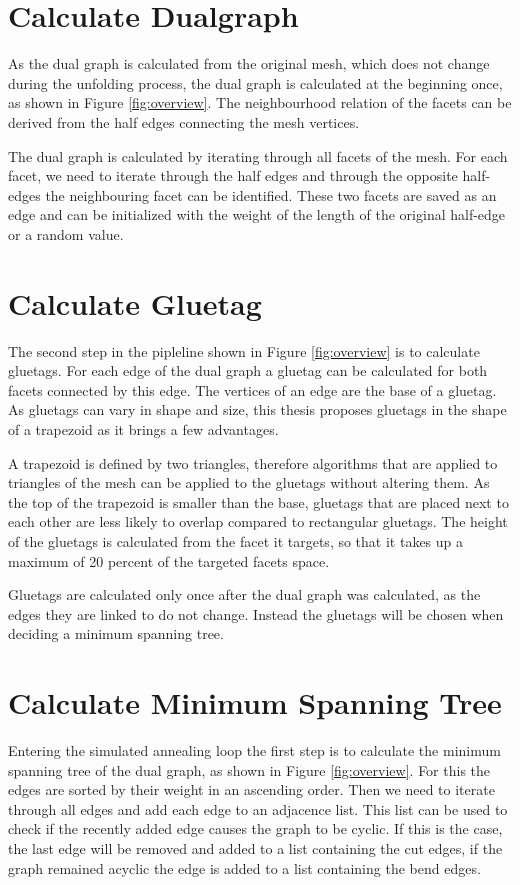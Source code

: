 \documentclass[draft,final]{vutinfth} %
\begin{document}
\section{Calculate Dualgraph}

As the dual graph is calculated from the original mesh, which does not change during the unfolding process, the dual graph is calculated at the beginning once, as shown in Figure \ref{fig:overview}. The neighbourhood relation of the facets can be derived from the half edges connecting the mesh vertices. 

The dual graph is calculated by iterating through all facets of the mesh. For each facet, we need to iterate through the half edges and through the opposite half-edges the neighbouring facet can be identified. These two facets are saved as an edge and can be initialized with the weight of the length of the original half-edge or a random value.

\section{Calculate Gluetag}

The second step in the pipleline shown in Figure \ref{fig:overview} is to calculate gluetags. For each edge of the dual graph a gluetag can be calculated for both facets connected by this edge. The vertices of an edge are the base of a gluetag. As gluetags can vary in shape and size, this thesis proposes gluetags in the shape of a trapezoid as it brings a few advantages. 

A trapezoid is defined by two triangles, therefore algorithms that are applied to triangles of the mesh can be applied to the gluetags without altering them. As the top of the trapezoid is smaller than the base, gluetags that are placed next to each other are less likely to overlap compared to rectangular gluetags. The height of the gluetags is calculated from the facet it targets, so that it takes up a maximum of 20 percent of the targeted facets space.

Gluetags are calculated only once after the dual graph was calculated, as the edges they are linked to do not change. Instead the gluetags will be chosen when deciding a minimum spanning tree. 

\section{Calculate Minimum Spanning Tree}

Entering the simulated annealing loop the first step is to calculate the minimum spanning tree of the dual graph, as shown in Figure \ref{fig:overview}. For this the edges are sorted by their weight in an ascending order. Then we need to iterate through all edges and add each edge to an adjacence list. This list can be used to check if the recently added edge causes the graph to be cyclic. If this is the case, the last edge will be removed and added to a list containing the cut edges, if the graph remained acyclic the edge is added to a list containing the bend edges. 
\end{document}

